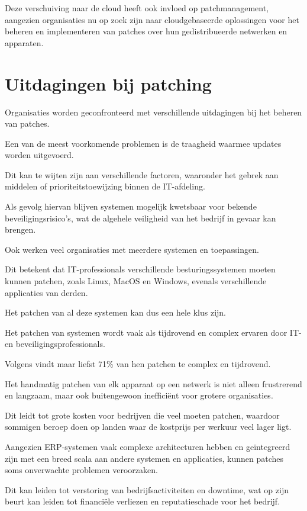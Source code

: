 Deze verschuiving naar de cloud heeft ook invloed op patchmanagement, aangezien organisaties nu op zoek zijn naar cloudgebaseerde oplossingen voor het beheren en implementeren van patches over hun gedistribueerde netwerken en apparaten.

\section{Uitdagingen bij patching}
Organisaties worden geconfronteerd met verschillende uitdagingen bij het beheren van patches.

Een van de meest voorkomende problemen is de traagheid waarmee updates worden uitgevoerd.

Dit kan te wijten zijn aan verschillende factoren, waaronder het gebrek aan middelen of prioriteitstoewijzing binnen de IT-afdeling.

Als gevolg hiervan blijven systemen mogelijk kwetsbaar voor bekende beveiligingsrisico's, wat de algehele veiligheid van het bedrijf in gevaar kan brengen.

Ook werken veel organisaties met meerdere systemen en toepassingen.

Dit betekent dat IT-professionals verschillende besturingssystemen moeten kunnen patchen, zoals Linux, MacOS en Windows, evenals verschillende applicaties van derden.

Het patchen van al deze systemen kan dus een hele klus zijn.

Het patchen van systemen wordt vaak als tijdrovend en complex ervaren door IT- en beveiligingsprofessionals.

Volgens \textcite{ivanti2021} vindt maar liefst 71\% van hen patchen te complex en tijdrovend.

Het handmatig patchen van elk apparaat op een netwerk is niet alleen frustrerend en langzaam, maar ook buitengewoon inefficiënt voor grotere organisaties.

Dit leidt tot grote kosten voor bedrijven die veel moeten patchen, waardoor sommigen beroep doen op landen waar de kostprijs per werkuur veel lager ligt.

Aangezien ERP-systemen vaak complexe architecturen hebben en geïntegreerd zijn met een breed scala aan andere systemen en applicaties, kunnen patches soms onverwachte problemen veroorzaken.

Dit kan leiden tot verstoring van bedrijfsactiviteiten en downtime, wat op zijn beurt kan leiden tot financiële verliezen en reputatieschade voor het bedrijf.


